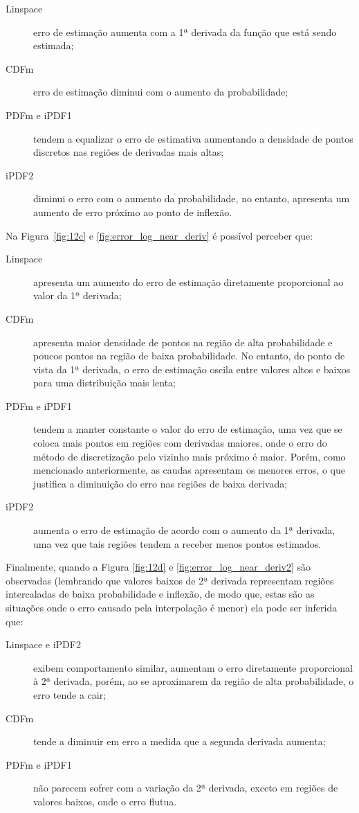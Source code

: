 \begin{description}
	\item[Linspace] erro de estimação aumenta com a 1ª derivada da função que está sendo estimada;
	\item[CDFm] erro de estimação diminui com o aumento da probabilidade; 
	\item[PDFm e iPDF1] tendem a equalizar o erro de estimativa aumentando a densidade de pontos discretos nas regiões de derivadas mais altas; 
	\item[iPDF2] diminui o erro com o aumento da probabilidade, no entanto, apresenta um aumento de erro próximo ao ponto de inflexão.
\end{description}  

Na Figura~\ref{fig:12c} e \ref{fig:error_log_near_deriv} é possível perceber que:
 \begin{description}
	\item[Linspace] apresenta um aumento do erro de estimação diretamente proporcional ao valor da 1ª derivada;
	\item[CDFm] apresenta maior densidade de pontos na região de alta probabilidade e poucos pontos na região de baixa probabilidade. No entanto, do ponto de vista da 1ª derivada, o erro de estimação oscila entre valores altos e baixos para uma distribuição mais lenta;
	\item[PDFm e iPDF1] tendem a manter constante o valor do erro de estimação, uma vez que se coloca mais pontos em regiões com derivadas maiores, onde o erro do método de discretização pelo vizinho mais próximo é maior. Porém, como mencionado anteriormente, as caudas apresentam os menores erros, o que justifica a diminuição do erro nas regiões de baixa derivada;
	\item[iPDF2] aumenta o erro de estimação de acordo com o aumento da 1ª derivada, uma vez que tais regiões tendem a receber menos pontos estimados.
\end{description}  

Finalmente, quando a Figura \ref{fig:12d} e \ref{fig:error_log_near_deriv2} são observadas (lembrando que valores baixos de 2ª derivada representam regiões intercaladas de baixa probabilidade e inflexão, de modo que, estas são as situações onde o erro causado pela interpolação é menor) ela pode ser inferida que:

\begin{description}
	\item[Linspace e iPDF2] exibem comportamento similar, aumentam o erro diretamente proporcional à 2ª derivada, porém, ao se aproximarem da região de alta probabilidade, o erro tende a cair;
	\item[CDFm] tende a diminuir em erro a medida que a segunda derivada aumenta;
	\item[PDFm e iPDF1] não parecem sofrer com a variação da 2ª derivada, exceto em regiões de valores baixos, onde o erro flutua.
\end{description}

